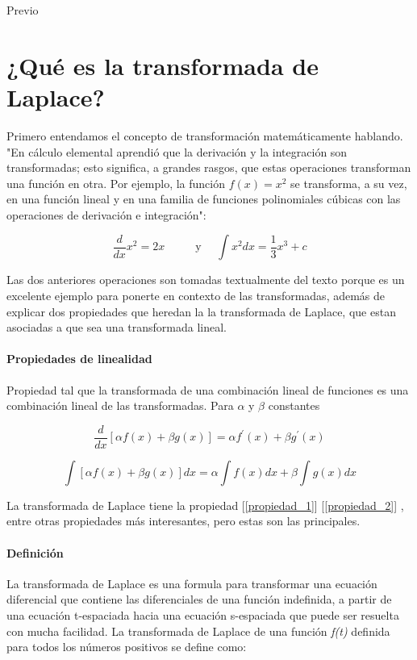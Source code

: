 {\Huge Previo }

\noindent \justify

\section{¿Qué es la transformada de Laplace?}

Primero entendamos el concepto de transformación matemáticamente hablando.
"En cálculo elemental aprendió que la derivación y la integración son transformadas; esto significa, a grandes rasgos, que estas operaciones transforman una función en otra. Por ejemplo, la función $f(x)=x^{2}$ se transforma, a su vez, en una función lineal y en una familia de funciones polinomiales cúbicas con las operaciones de derivación e integración":


\begin{equation}
		\frac{d}{d x} x^{2}=2 x \hspace{1cm}
		\text { y } \quad \int x^{2} d x=\frac{1}{3} x^{3}+c
\end{equation}

Las dos anteriores operaciones son   tomadas textualmente del texto  porque es un excelente ejemplo para ponerte en contexto de las transformadas, además de explicar dos propiedades que heredan la la transformada de Laplace, que estan asociadas a que sea una transformada lineal.

\paragraph*{Propiedades de linealidad}

Propiedad  tal que la transformada de una combinación lineal de funciones es una combinación lineal de las transformadas. Para $\alpha$ y $\beta$ constantes

\begin{equation}
	\frac{d}{d x}[\alpha f(x)+\beta g(x)]=\alpha f^{\prime}(x)+\beta g^{\prime}(x)
	\label{propiedad_1}
\end{equation}

\begin{equation}
	\int[\alpha f(x)+\beta g(x)] d x=\alpha \int f(x) d x+\beta \int g(x) d x
	\label{propiedad_2}
\end{equation}

La transformada de Laplace tiene la propiedad [\ref{propiedad_1}] [\ref{propiedad_2}] , entre otras propiedades más interesantes, pero estas son las principales.


\paragraph*{Definición}
La transformada de Laplace es una formula para transformar una ecuación
diferencial que contiene las diferenciales de una función indefinida, a partir de una
ecuación t-espaciada hacia una ecuación s-espaciada que puede ser resuelta con mucha facilidad.	
\newline
La transformada de Laplace de una función \textit{f(t)} definida para todos los números positivos se define como:

